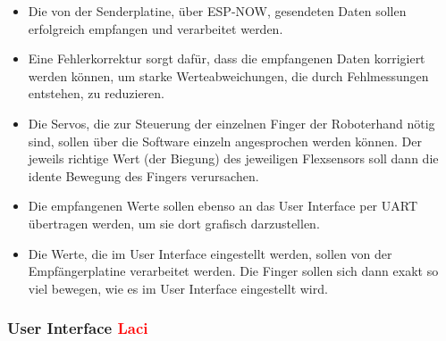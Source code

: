 \documentclass[11pt]{article}
\begin{document}
	\begin{itemize}
		\item Die von der Senderplatine, über ESP-NOW, gesendeten Daten sollen erfolgreich empfangen und verarbeitet werden.
		\item Eine Fehlerkorrektur sorgt dafür, dass die empfangenen Daten korrigiert werden können, um starke Werteabweichungen, 
			  die durch Fehlmessungen entstehen, zu reduzieren.
		\item Die Servos, die zur Steuerung der einzelnen Finger der Roboterhand nötig sind, sollen über die Software einzeln 
			  angesprochen werden können. Der jeweils richtige Wert (der Biegung) des jeweiligen Flexsensors soll dann die idente 
			  Bewegung des Fingers verursachen.
		\item Die empfangenen Werte sollen ebenso an das User Interface per UART übertragen werden, um sie dort grafisch 
			  darzustellen.
		\item Die Werte, die im User Interface eingestellt werden, sollen von der Empfängerplatine verarbeitet werden. Die Finger 
			  sollen sich dann exakt so viel bewegen, wie es im User Interface eingestellt wird.
	\end{itemize}

\subsubsection{User Interface \textcolor{red}{Laci}}
\end{document}
